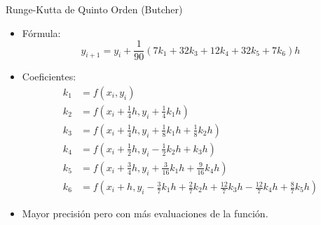 \documentclass[main.tex]{subfiles}
\begin{document}
\begin{frame}{\small Runge-Kutta de Quinto Orden (Butcher)}
\begin{itemize}
  \item Fórmula:
  \[
    y_{i+1} = y_i + \frac{1}{90}(7k_1 + 32k_3 + 12k_4 + 32k_5 + 7k_6) h
  \]
  \item Coeficientes:
  \begin{align*}
    k_1 &= f(x_i, y_i) \\
    k_2 &= f\left(x_i + \frac{1}{4}h, y_i + \frac{1}{4}k_1 h\right) \\
    k_3 &= f\left(x_i + \frac{1}{4}h, y_i + \frac{1}{8}k_1 h + \frac{1}{8}k_2 h\right) \\
    k_4 &= f\left(x_i + \frac{1}{2}h, y_i - \frac{1}{2}k_2 h + k_3 h\right) \\
    k_5 &= f\left(x_i + \frac{3}{4}h, y_i + \frac{3}{16}k_1 h + \frac{9}{16}k_4 h\right) \\
    k_6 &= f\left(x_i + h, y_i - \frac{3}{7}k_1 h + \frac{2}{7}k_2 h + \frac{12}{7}k_3 h - \frac{12}{7}k_4 h + \frac{8}{7}k_5 h\right)
  \end{align*}
  \item Mayor precisión pero con más evaluaciones de la función.
\end{itemize}
\end{frame}
\end{document}
